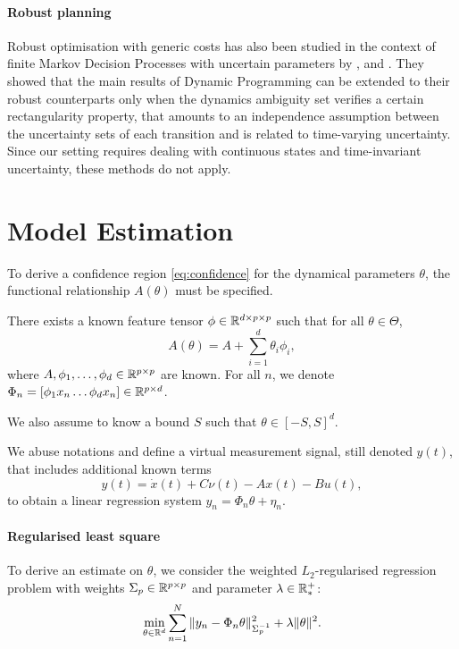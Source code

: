 \documentclass{article}
\begin{document}
\paragraph{Robust planning}
Robust optimisation with generic costs has also been studied in the context of finite Markov Decision Processes with uncertain parameters by \citet{Iyengar2005}, \citet{Nilim2005} and \citet{Wiesemann2013}. They showed that the main results of Dynamic Programming can be extended to their robust counterparts only when the dynamics ambiguity set verifies a certain rectangularity property, that amounts to an independence assumption between the uncertainty sets of each transition and is related to time-varying uncertainty. Since our setting requires dealing with continuous states and time-invariant uncertainty, these methods do not apply.

\section{Model Estimation}

\label{sec:estimation}

To derive a confidence region \eqref{eq:confidence} for the dynamical parameters $\theta$, the functional relationship $A(\theta)$ must be specified.
\begin{assumption}[Structure]
\label{assumpt:structure}
There exists a known feature tensor $\phi\in \mathbb{R}^{d \times p \times p}$ such that for all $\theta\in\Theta$,
\begin{equation}
    A(\theta) = A + %
    \sum_{i=1}^d \theta_i\phi_i,
\end{equation}
where $A,\phi_1,\dots,\phi_d\in\mathbb{R}^{p\times p}$ are known. For all $n$, we denote $\Phi_n = [\phi_1 x_n \dots \phi_d x_n]\in\mathbb{R}^{p\times d}$.

We also assume to know a bound $S$ such that $\theta\in[-S,S]^d$.
\end{assumption}

We abuse notations and define a virtual measurement signal, still denoted $y(t)$, that includes additional known terms
\begin{equation*}
    y(t) = \dot{x}(t) + C\nu(t) - A x(t) - Bu(t),
\end{equation*}
to obtain a linear regression system
$
y_n = \Phi_n\theta + \eta_n.
$

\paragraph{Regularised least square} To derive an estimate on $\theta$, we consider the weighted $L_2$-regularised regression problem with weights  $\Sigma_p\in\mathbb{R}^{p\times p}$ and parameter $\lambda\in\mathbb{R}^+_*$:
\begin{equation}
    \label{eq:regression_min}
    \min_{\theta\in\mathbb{R}^d} \sum_{n=1}^N \|y_n -\Phi_n\theta\|_{\Sigma_p^{-1}}^2 + \lambda\|\theta\|_{}^2.
\end{equation}
\end{document}
